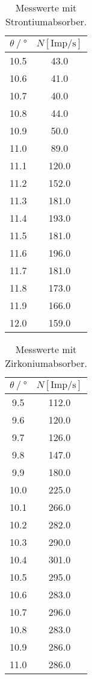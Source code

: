   \begin{table}
    \centering
    \caption{Messwerte mit Strontiumabsorber.}
    \label{tab:strontiumtab}
    \begin{tabular}{c c}
      \toprule
      $\theta \mathbin{/}°$ & $N [\text{Imp}/\si{\s}]$ \\
      \midrule
      10.5	& 43.0\\
      10.6	& 41.0\\
      10.7	& 40.0\\
      10.8	& 44.0\\
      10.9	& 50.0\\
      11.0	& 89.0\\
      11.1	& 120.0\\
      11.2	& 152.0\\
      11.3	& 181.0\\
      11.4	& 193.0\\
      11.5	& 181.0\\
      11.6	& 196.0\\
      11.7	& 181.0\\
      11.8	& 173.0\\
      11.9	& 166.0\\
      12.0	& 159.0\\
      \bottomrule
    \end{tabular}
  \end{table}

  \begin{table}
    \centering
    \caption{Messwerte mit Zirkoniumabsorber.}
    \label{tab:zirkoniumtab}
    \begin{tabular}{c c}
      \toprule
      $\theta \mathbin{/}°$ & $N [\text{Imp}/\si{\s}]$ \\
      \midrule
      9.5	& 112.0\\
      9.6	& 120.0\\
      9.7	& 126.0\\
      9.8	& 147.0\\
      9.9	& 180.0\\
      10.0	& 225.0\\
      10.1	& 266.0\\
      10.2	& 282.0\\
      10.3	& 290.0\\
      10.4	& 301.0\\
      10.5	& 295.0\\
      10.6	& 283.0\\
      10.7	& 296.0\\
      10.8	& 283.0\\
      10.9	& 286.0\\
      11.0	& 286.0\\
      \bottomrule
    \end{tabular}
  \end{table}
  \FloatBarrier


